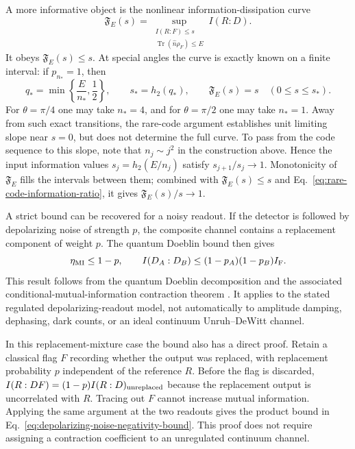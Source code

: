 \documentclass[pdflatex,sn-mathphys-num]{sn-jnl}
\begin{document}
A more informative object is the nonlinear information-dissipation curve
\begin{equation}
\mathfrak F_E(s)=
\sup_{\substack{I(R:F)\leq s\\ \operatorname{Tr}(\hat n\rho_F)\leq E}}
I(R:D).
\label{eq:quantum-information-dissipation-curve}
\end{equation}
It obeys $\mathfrak F_E(s)\leq s$. At special angles the curve is exactly known on a finite interval: if $p_{n_*}=1$, then
\begin{equation}
q_*=\min\left\{\frac{E}{n_*},\frac12\right\},\qquad
s_*=h_2(q_*),\qquad
\mathfrak F_E(s)=s\quad(0\leq s\leq s_*).
\label{eq:jc-exact-linear-curve-segment}
\end{equation}
For $\theta=\pi/4$ one may take $n_*=4$, and for $\theta=\pi/2$ one may take $n_*=1$. Away from such exact transitions, the rare-code argument establishes unit limiting slope near $s=0$, but does not determine the full curve. To pass from the code sequence to this slope, note that $n_j\sim j^2$ in the construction above. Hence the input information values $s_j=h_2(E/n_j)$ satisfy $s_{j+1}/s_j\to1$. Monotonicity of $\mathfrak F_E$ fills the intervals between them; combined with $\mathfrak F_E(s)\leq s$ and Eq.~\eqref{eq:rare-code-information-ratio}, it gives $\mathfrak F_E(s)/s\to1$.

A strict bound can be recovered for a noisy readout. If the detector is followed by depolarizing noise of strength $p$, the composite channel contains a replacement component of weight $p$. The quantum Doeblin bound then gives
\begin{equation}
\eta_{\rm MI}\leq1-p,\qquad
I(D_A:D_B)\leq(1-p_A)(1-p_B)I_{\rm F}.
\label{eq:depolarizing-noise-negativity-bound}
\end{equation}
This result follows from the quantum Doeblin decomposition and the associated conditional-mutual-information contraction theorem \cite{GeorgeHircheNuradhaWilde2026Doeblin,HircheGeorgeNuradhaWilde2026Conditional}. It applies to the stated regulated depolarizing-readout model, not automatically to amplitude damping, dephasing, dark counts, or an ideal continuum Unruh--DeWitt channel.

In this replacement-mixture case the bound also has a direct proof. Retain a classical flag $F$ recording whether the output was replaced, with replacement probability $p$ independent of the reference $R$. Before the flag is discarded, $I(R:DF)=(1-p)I(R:D)_{\rm unreplaced}$ because the replacement output is uncorrelated with $R$. Tracing out $F$ cannot increase mutual information. Applying the same argument at the two readouts gives the product bound in Eq.~\eqref{eq:depolarizing-noise-negativity-bound}. This proof does not require assigning a contraction coefficient to an unregulated continuum channel.
\end{document}
